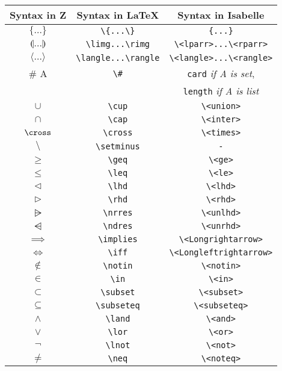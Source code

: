 {\def\arraystretch{0.5}\tabcolsep=0.5pt
\begin{longtable}[H]{|c | c | c |}
\hline
\textbf{Syntax in Z} & \textbf{Syntax in \LaTeX} & \textbf{Syntax in Isabelle} \\
\hline
\hline
$\{...\}$ & \verb|\{...\}| & \verb|{...}|\\
\hline
$\limg...\rimg$ & \verb|\limg...\rimg| & \verb|\<lparr>...\<rparr>| \\
\hline
$\langle...\rangle$ & \verb|\langle...\rangle| & \verb|\<langle>...\<rangle>| \\
\hline
$\# $ A & \verb|\#| & \verb|card| \textit{if A is set}, \\
& & \verb|length| \textit{if A is list} \\
\hline
$\cup $ & \verb|\cup| & \verb|\<union>| \\
\hline
$\cap$ & \verb|\cap| & \verb|\<inter>| \\
\hline
$\cross$ & \verb|\cross| & \verb|\<times>| \\
\hline
$\setminus$ & \verb|\setminus| & \verb|-| \\
\hline
$\geq$ & \verb|\geq| & \verb|\<ge>| \\
\hline
$\leq$ & \verb|\leq| & \verb|\<le>| \\
\hline
$\lhd$ & \verb|\lhd| & \verb|\<lhd>| \\
\hline
$\rhd$ & \verb|\rhd| & \verb|\<rhd>| \\
\hline
$\nrres$ & \verb|\nrres| & \verb|\<unlhd>| \\
\hline
$\ndres$ & \verb|\ndres| & \verb|\<unrhd>| \\
\hline
$\implies$ & \verb|\implies| & \verb|\<Longrightarrow>| \\
\hline
$\iff$ & \verb|\iff| & \verb|\<Longleftrightarrow>| \\
\hline
$\notin$ & \verb|\notin| & \verb|\<notin>| \\
\hline
$\in$ & \verb|\in| & \verb|\<in>| \\
\hline
$\subset$ & \verb|\subset| & \verb|\<subset>| \\
\hline
$\subseteq$ & \verb|\subseteq| & \verb|\<subseteq>| \\
\hline
$\land$ & \verb|\land| & \verb|\<and>| \\
\hline
$\lor$ & \verb|\lor| & \verb|\<or>| \\
\hline
$\lnot$ & \verb|\lnot| & \verb|\<not>| \\
\hline
$\neq$ & \verb|\neq| & \verb|\<noteq>| \\

\end{longtable}}

